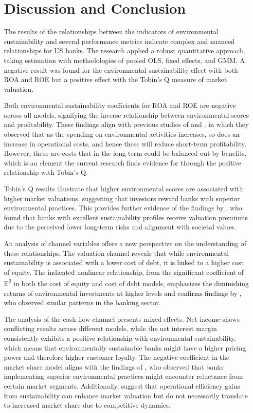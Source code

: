 \documentclass[11pt, a4paper]{article}
\begin{document}
\newpage
\section{Discussion and Conclusion}
The results of the relationships between the indicators of environmental sustainability and several performance metrics indicate complex and nuanced relationships for US banks. The research applied a robust quantitative approach, taking estimation with methodologies of pooled OLS, fixed effects, and GMM. A negative result was found for the environmental sustainability effect with both ROA and ROE but a positive effect with the Tobin's Q measure of market valuation. 

Both environmental sustainability coefficients for ROA and ROE are negative across all models, signifying the inverse relationship between environmental scores and profitability. These findings align with previous studies of \cite{Wu2013} and \cite{Khan2023a}, in which they observed that as the spending on environmental activities increases, so does an increase in operational costs, and hence these will reduce short-term profitability. However, these are costs that in the long-term could be balanced out by benefits, which is an element the current research finds evidence for through the positive relationship with Tobin's Q. 

Tobin’s Q results illustrate that higher environmental scores are associated with higher market valuations, suggesting that investors reward banks with superior environmental practices. This provides further evidence of the findings by \cite{Scholtens2009}, who found that banks with excellent sustainability profiles receive valuation premiums due to the perceived lower long-term risks and alignment with societal values.  

An analysis of channel variables offers a new perspective on the understanding of these relationships. The valuation channel reveals that while environmental sustainability is associated with a lower cost of debt, it is linked to a higher cost of equity. The indicated nonlinear relationship, from the significant coefficient of E\textsuperscript{2} in both the cost of equity and cost of debt models, emphasizes the diminishing returns of environmental investments at higher levels and confirms findings by \cite{Goss2011}, who observed similar patterns in the banking sector. 

The analysis of the cash flow channel presents mixed effects. Net income shows conflicting results across different models, while the net interest margin consistently exhibits a positive relationship with environmental sustainability, which means that environmentally sustainable banks might have a higher pricing power and therefore higher customer loyalty. The negative coefficient in the market share model aligns with the findings of \cite{Bussoli2018}, who observed that banks implementing superior environmental practices might encounter reluctance from certain market segments. Additionally, \cite{Kwon2019} suggest that operational efficiency gains from sustainability can enhance market valuation but do not necessarily translate to increased market share due to competitive dynamics. 
\end{document}
